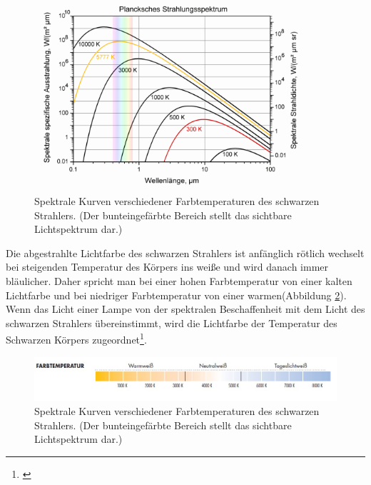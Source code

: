 \begin{figure}[H]     %
\centering
\includegraphics[width=0.9\textwidth]{bilder/cct2} 
\caption {Spektrale Kurven verschiedener Farbtemperaturen des schwarzen Strahlers. (Der bunteingefärbte Bereich stellt das sichtbare Lichtspektrum dar.)\protect\footnotemark}\label{b_cct2}
\end{figure}

Die abgestrahlte Lichtfarbe des schwarzen Strahlers ist anfänglich rötlich wechselt bei steigenden Temperatur des Körpers ins weiße und wird danach immer bläulicher. Daher spricht man bei einer hohen Farbtemperatur von einer kalten Lichtfarbe und bei niedriger Farbtemperatur von einer warmen(Abbildung \ref{b_cct1}). Wenn das Licht einer Lampe von der spektralen Beschaffenheit mit dem Licht des schwarzen Strahlers übereinstimmt, wird die Lichtfarbe der Temperatur des Schwarzen Körpers zugeordnet\footnote{\cite[89]{mueller}}.

\begin{figure}[H]     %
\centering
\includegraphics[width=1.0\textwidth]{bilder/cct1} 
\caption {Spektrale Kurven verschiedener Farbtemperaturen des schwarzen Strahlers. (Der bunteingefärbte Bereich stellt das sichtbare Lichtspektrum dar.)\protect\footnotemark}\label{b_cct1}
\end{figure}



